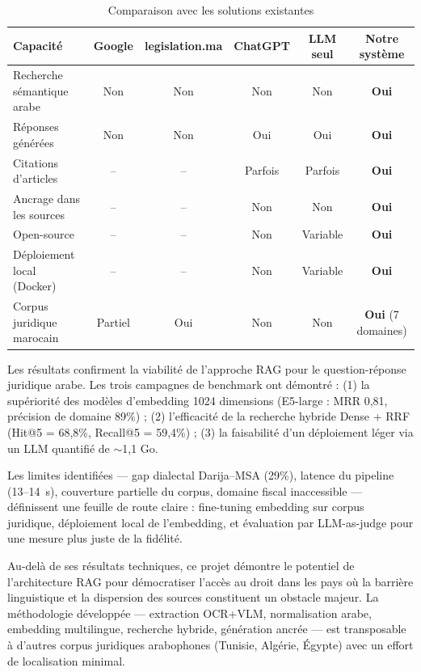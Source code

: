 \begin{table}[H]
\centering
\caption{Comparaison avec les solutions existantes}
\label{tab:comparaison}
\begin{tabular}{lccccc}
\toprule
\textbf{Capacité} & \textbf{Google} & \textbf{legislation.ma} & \textbf{ChatGPT} & \textbf{LLM seul} & \textbf{Notre système} \\
\midrule
Recherche sémantique arabe & Non & Non & Non & Non & \textbf{Oui} \\
Réponses générées & Non & Non & Oui & Oui & \textbf{Oui} \\
Citations d'articles & -- & -- & Parfois & Parfois & \textbf{Oui} \\
Ancrage dans les sources & -- & -- & Non & Non & \textbf{Oui} \\
Open-source & -- & -- & Non & Variable & \textbf{Oui} \\
Déploiement local (Docker) & -- & -- & Non & Variable & \textbf{Oui} \\
Corpus juridique marocain & Partiel & Oui & Non & Non & \textbf{Oui} (7 domaines) \\
\bottomrule
\end{tabular}
\end{table}

\noindent Les résultats confirment la viabilité de l'approche RAG pour le
question-réponse juridique arabe. Les trois campagnes de benchmark ont
démontré : (1) la supériorité des modèles d'embedding 1024 dimensions
(E5-large : MRR 0,81, précision de domaine 89\%) ; (2) l'efficacité de la
recherche hybride Dense + RRF (Hit@5 = 68,8\%, Recall@5 = 59,4\%) ; (3) la
faisabilité d'un déploiement léger via un LLM quantifié de $\sim$1,1 Go.

\vspace{0.2cm}

\noindent Les limites identifiées — gap dialectal Darija--MSA (29\%), latence
du pipeline (13--14~s), couverture partielle du corpus, domaine fiscal
inaccessible — définissent une feuille de route claire : fine-tuning
embedding sur corpus juridique, déploiement local de l'embedding, et
évaluation par LLM-as-judge pour une mesure plus juste de la fidélité.

\vspace{0.2cm}

\noindent Au-delà de ses résultats techniques, ce projet démontre le potentiel
de l'architecture RAG pour démocratiser l'accès au droit dans les pays où la
barrière linguistique et la dispersion des sources constituent un obstacle
majeur. La méthodologie développée — extraction OCR+VLM, normalisation arabe,
embedding multilingue, recherche hybride, génération ancrée — est transposable
à d'autres corpus juridiques arabophones (Tunisie, Algérie, Égypte) avec un
effort de localisation minimal.